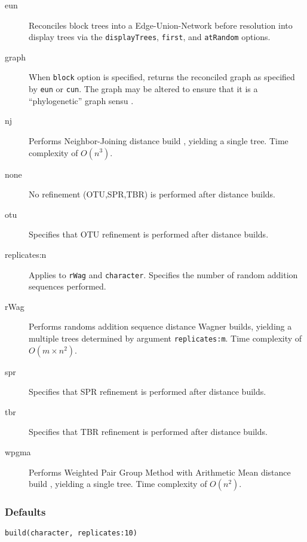 \begin{description}
		\item [eun] Reconciles block trees into a Edge-Union-Network \citep{MiyagiandWheeler2019, 
		Wheeler2022} before resolution into display trees via the \texttt{displayTrees}, \texttt{first}, and 
		\texttt{atRandom} options.

		\item [graph] When \texttt{block} option is specified, returns the reconciled graph as specified by 
		\texttt{eun} or \texttt{cun}. The graph may be altered to ensure that it is a ``phylogenetic'' graph 
		sensu \cite{Moretetal2005}.
		
		\item [nj] Performs Neighbor-Joining distance build \citep{Saitou1987}, yielding a single tree. 
		Time complexity of $O(n^3)$.

		\item [none] No refinement (OTU,SPR,TBR) is performed after distance builds.
	
		\item [otu] Specifies that OTU refinement \citep{Wheeler2021} is performed after distance builds.	
		
		\item [replicates:n] Applies to \texttt{rWag} and \texttt{character}. Specifies the number of 
		random addition sequences performed. 
		
		\item [rWag] Performs randoms addition sequence distance Wagner builds, yielding a multiple 
		trees determined by argument \texttt{replicates:m}. Time complexity of $O(m \times n^2)$.

		\item [spr] Specifies that SPR refinement \citep{Dayhoff1969} is performed after distance builds.

		\item [tbr] Specifies that TBR refinement \citep{Farris1988, swofford1990a} is performed after 
		distance builds.
		
		\item [wpgma] Performs Weighted Pair Group Method with Arithmetic Mean distance build 
		\citep{SokalandMichener1958}, yielding a single tree. Time complexity of $O(n^2)$.
	
	\end{description}		

	\subsubsection{Defaults}
		\texttt{build(character, replicates:10)}


